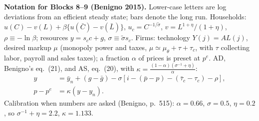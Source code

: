 
{\footnotesize\noindent\textbf{Notation for Blocks 8--9 (Benigno 2015).} Lower-case letters are log deviations from an efficient
steady state; bars denote the long run. Households: $u(C)-v(L)+\beta\{u(\bar C)-v(\bar L)\}$, $u_c=C^{-1/\tilde\sigma}$, $v=L^{1+\eta}/(1+\eta)$,
$\rho\equiv-\ln\beta$; resources $y=s_cc+g$, $\sigma\equiv\tilde\sigma s_c$. Firms: technology $Y(j)=AL(j)$, desired markup $\mu$ (monopoly power and
taxes, $\mu\simeq\mu_\theta+\tau+\tau_c$, with $\tau$ collecting labor, payroll and sales taxes); a fraction $\alpha$ of prices is preset at $p^e$.
AD, Benigno's eq.~(21), and AS, eq.~(20), with $\kappa=\frac{(1-\alpha)(\sigma^{-1}+\eta)}{\alpha}$:
\begin{align}
y&=\bar y_n+(g-\bar g)-\sigma[i-(\bar p-p)-(\bar\tau_c-\tau_c)-\rho], \tag{AD}\label{b8:AD}\\
p-p^e&=\kappa(y-y_n). \tag{AS}\label{b8:AS}
\end{align}
Calibration when numbers are asked (Benigno, p.~515): $\alpha=0.66$, $\sigma=0.5$, $\eta=0.2$, so $\sigma^{-1}+\eta=2.2$, $\kappa=1.133$.\par}


